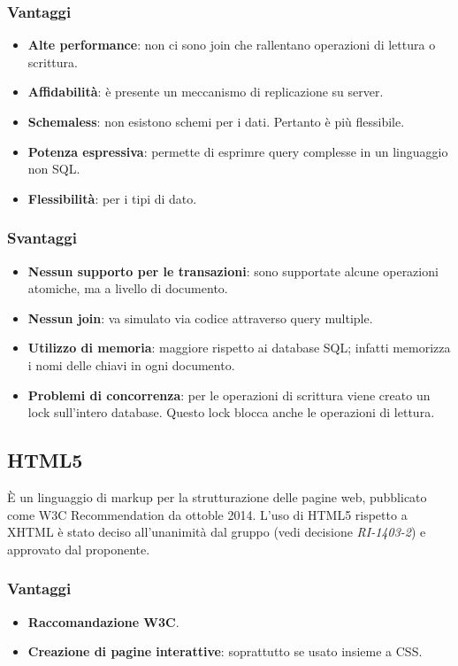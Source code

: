 \subsubsection{Vantaggi}
\begin{itemize}
\item \textbf{Alte performance}: non ci sono join che rallentano operazioni di lettura o scrittura. 
\item \textbf{Affidabilit\`a}: \`e presente un meccanismo di replicazione su server.
\item \textbf{Schemaless}: non esistono schemi per i dati. Pertanto \`e pi\`u flessibile.
\item \textbf{Potenza espressiva}: permette di esprimre query complesse in un linguaggio non SQL.
\item \textbf{Flessibilit\`a}: per i tipi di dato.
\end{itemize}
\subsubsection{Svantaggi}
\begin{itemize}
\item \textbf{Nessun supporto per le transazioni}: sono supportate alcune operazioni atomiche, ma a livello di documento.
\item \textbf{Nessun join}: va simulato via codice attraverso query multiple.
\item \textbf{Utilizzo di memoria}: maggiore rispetto ai database SQL; infatti memorizza i nomi delle chiavi in ogni documento. 
\item \textbf{Problemi di concorrenza}: per le operazioni di scrittura viene creato un lock sull'intero database. Questo lock blocca anche le operazioni di lettura.
\end{itemize}
\subsection{HTML5}
\`E un linguaggio di markup per la strutturazione delle pagine web, pubblicato come W3C Recommendation da ottoble 2014. L'uso di HTML5 rispetto a XHTML \`e stato deciso all'unanimit\`a dal gruppo (vedi decisione \textit{RI-1403-2}) e approvato dal proponente.
\subsubsection{Vantaggi}
\begin{itemize}
\item \textbf{Raccomandazione W3C}.
\item \textbf{Creazione di pagine interattive}: soprattutto se usato insieme a CSS.
\end{itemize}
